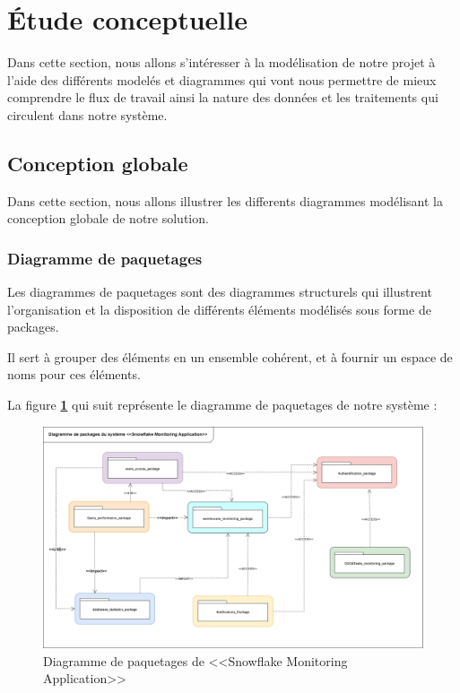 \section{Étude conceptuelle}
\par Dans cette section, nous allons s'intéresser à la modélisation de notre projet à l'aide des différents modelés et diagrammes qui vont nous permettre de mieux
 comprendre le flux de travail ainsi la nature des données et les traitements qui circulent dans notre système.
\subsection{Conception globale}
    \par Dans cette section, nous allons illustrer les differents diagrammes modélisant la conception globale de notre solution.
    \subsubsection{Diagramme de paquetages}
    \par Les diagrammes de paquetages sont des diagrammes structurels qui illustrent l'organisation et la disposition de différents éléments modélisés sous forme de packages\cite{diag_pack}.

    \par Il sert à grouper des éléments en un ensemble cohérent, et à fournir un espace de noms pour ces éléments.\par La figure \textbf{\ref{fig :pack}} qui suit représente le diagramme de paquetages de notre système : 
            \begin{figure}[H]
            \centering
            \includegraphics[width=1\linewidth]{img/conception/diag_pack.png}
            \caption{Diagramme de paquetages de <<Snowflake Monitoring Application>>}
            \label{fig :pack}
            \end{figure}
